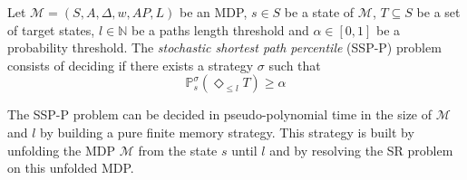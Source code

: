\begin{definition}
  Let $\mathcal{M} = (S, A, \Delta, w, AP, L)$ be an MDP, $s \in S$ be a state of
  $\mathcal{M}$, $T \subseteq S$ be a set of target states, $l \in \mathbb{N}$
  be a paths length threshold and $\alpha \in [0, 1]$ be a probability
  threshold. The \textit{stochastic shortest path percentile} (SSP-P) problem
  consists of deciding if there exists a strategy $\sigma$ such that
  \[
    \mathbb{P}_s^\sigma (\Diamond_{\leq l} T) \geq \alpha
  \]
\end{definition}

\begin{theorem}
  The SSP-P problem can be decided in pseudo-polynomial time in the size of $\mathcal{M}$ and $l$ by building a pure finite memory strategy. This strategy is built by unfolding the MDP $\mathcal{M}$ from the state $s$ until $l$ and by resolving the SR problem on this unfolded MDP.
\end{theorem}

